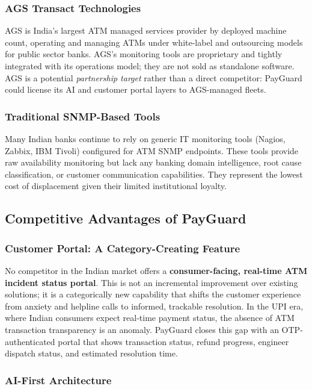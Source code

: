 \documentclass[12pt,a4paper]{article}
\begin{document}
\subsubsection{AGS Transact Technologies}

AGS is India's largest ATM managed services provider by deployed machine count, operating and
managing ATMs under white-label and outsourcing models for public sector banks. AGS's monitoring
tools are proprietary and tightly integrated with its operations model; they are not sold as
standalone software. AGS is a potential \textit{partnership target} rather than a direct
competitor: PayGuard could license its AI and customer portal layers to AGS-managed fleets.

\subsubsection{Traditional SNMP-Based Tools}

Many Indian banks continue to rely on generic IT monitoring tools (Nagios, Zabbix, IBM Tivoli)
configured for ATM SNMP endpoints. These tools provide raw availability monitoring but lack any
banking domain intelligence, root cause classification, or customer communication capabilities.
They represent the lowest cost of displacement given their limited institutional loyalty.

\subsection{Competitive Advantages of PayGuard}

\subsubsection{Customer Portal: A Category-Creating Feature}

No competitor in the Indian market offers a \textbf{consumer-facing, real-time ATM incident
status portal}. This is not an incremental improvement over existing solutions; it is a
categorically new capability that shifts the customer experience from anxiety and helpline calls
to informed, trackable resolution. In the UPI era, where Indian consumers expect real-time
payment status, the absence of ATM transaction transparency is an anomaly. PayGuard closes this
gap with an OTP-authenticated portal that shows transaction status, refund progress, engineer
dispatch status, and estimated resolution time.

\subsubsection{AI-First Architecture}
\end{document}
